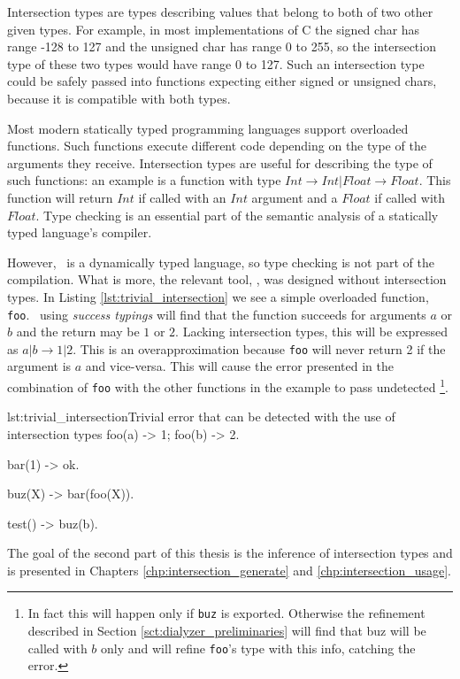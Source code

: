 Intersection types are types describing values that belong to both of
two other given types. For example, in most implementations of C the
signed char has range -128 to 127 and the unsigned char has range 0 to
255, so the intersection type of these two types would have range 0 to
127. Such an intersection type could be safely passed into functions
expecting either signed or unsigned chars, because it is compatible
with both types.

Most modern statically typed programming languages support overloaded
functions. Such functions execute different code depending on the type
of the arguments they receive. Intersection types are useful for
describing the type of such functions: an example is a function with
type $ Int \rightarrow Int | Float \rightarrow Float $. This function
will return $Int$ if called with an $Int$ argument and a $Float$ if
called with $Float$. Type checking is an essential part of the
semantic analysis of a statically typed language's compiler.

However, \er\ is a dynamically typed language, so type checking is not
part of the compilation. What is more, the relevant tool, \dr, was
designed without intersection types. In Listing
\ref{lst:trivial_intersection} we see a simple overloaded function,
\texttt{foo}. \dr\ using \emph{success typings} will find that the
function succeeds for arguments $a$ or $b$ and the return may be $1$
or $2$. Lacking intersection types, this will be expressed as $a | b
\rightarrow 1 | 2 $. This is an overapproximation because \texttt{foo}
will never return 2 if the argument is $a$ and vice-versa. This will
cause the error presented in the combination of \texttt{foo} with the
other functions in the example to pass undetected \footnote{In fact
  this will happen only if \texttt{buz} is exported. Otherwise the
  refinement described in Section \ref{sct:dialyzer_preliminaries}
  will find that buz will be called with $b$ only and will refine
  \texttt{foo}'s type with this info, catching the error.}.

\begin{console}{lst:trivial_intersection}{Trivial error that can be detected with the use of intersection types}
  foo(a) -> 1;
  foo(b) -> 2.

  bar(1) -> ok.

  buz(X) ->
    bar(foo(X)).

  test() ->
    buz(b).
\end{console}

The goal of the second part of this thesis is the inference of
intersection types and is presented in Chapters
\ref{chp:intersection_generate} and \ref{chp:intersection_usage}.
